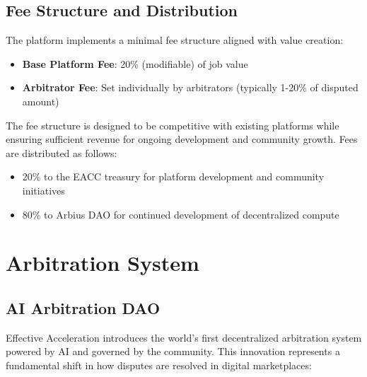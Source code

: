 \documentclass{article}
\begin{document}
\subsection{Fee Structure and Distribution}

The platform implements a minimal fee structure aligned with value creation:

\begin{itemize}
    \item \textbf{Base Platform Fee}: 20\% (modifiable) of job value
    \item \textbf{Arbitrator Fee}: Set individually by arbitrators (typically 1-20\% of disputed amount)
\end{itemize}

The fee structure is designed to be competitive with existing platforms while ensuring sufficient revenue for ongoing development and community growth. Fees are distributed as follows:

\begin{itemize}
    \item 20\% to the EACC treasury for platform development and community initiatives
    \item 80\% to Arbius DAO for continued development of decentralized compute
\end{itemize}

\section{Arbitration System}

\subsection{AI Arbitration DAO}

Effective Acceleration introduces the world's first decentralized arbitration system powered by AI and governed by the community. This innovation represents a fundamental shift in how disputes are resolved in digital marketplaces:
\end{document}
